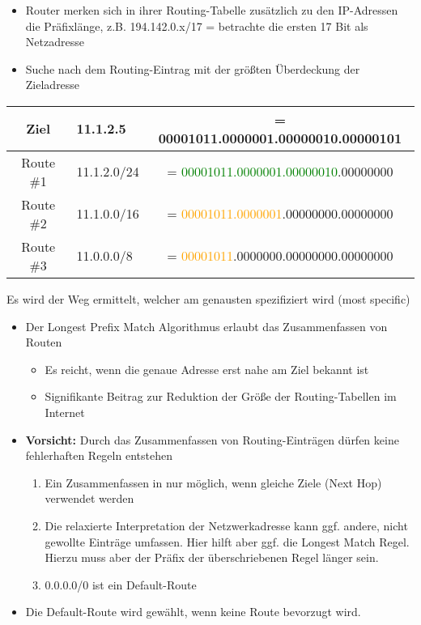 \begin{itemize}
    \item Router merken sich in ihrer Routing-Tabelle zusätzlich zu den IP-Adressen die Präfixlänge, z.B. 194.142.0.x/17 = betrachte die ersten 17 Bit als Netzadresse
\end{itemize}

\begin{itemize}
    \item Suche nach dem Routing-Eintrag mit der größten Überdeckung der Zieladresse
\end{itemize}
\begin{center}
    \begin{tabular}{c l c}
        Ziel      & 11.1.2.5    & = 00001011.0000001.00000010.00000101                     \\
        \hline
        Route \#1 & 11.1.2.0/24 & = \textcolor{green}{00001011.0000001.00000010}.00000000  \\
        Route \#2 & 11.1.0.0/16 & = \textcolor{orange}{00001011.0000001}.00000000.00000000 \\
        Route \#3 & 11.0.0.0/8  & = \textcolor{orange}{00001011}.0000000.00000000.00000000 \\
    \end{tabular}
\end{center}
Es wird der Weg ermittelt, welcher am genausten spezifiziert wird (most specific)

\begin{itemize}
    \item Der Longest Prefix Match Algorithmus erlaubt das Zusammenfassen von Routen
    \begin{itemize}
        \item Es reicht, wenn die genaue Adresse erst nahe am Ziel bekannt ist
        \item Signifikante Beitrag zur Reduktion der Größe der Routing-Tabellen im Internet
    \end{itemize}
    \item \textbf{Vorsicht:} Durch das Zusammenfassen von Routing-Einträgen dürfen keine fehlerhaften Regeln entstehen
    \begin{enumerate}
        \item Ein Zusammenfassen in nur möglich, wenn gleiche Ziele (Next Hop) verwendet werden
        \item Die relaxierte Interpretation der Netzwerkadresse kann ggf. andere, nicht gewollte Einträge umfassen. Hier hilft aber ggf. die Longest Match Regel. Hierzu muss aber der Präfix der überschriebenen Regel länger sein.
        \item 0.0.0.0/0 ist ein Default-Route
    \end{enumerate}
\end{itemize}

\begin{itemize}
    \item Die Default-Route wird gewählt, wenn keine Route bevorzugt wird.
\end{itemize}
    